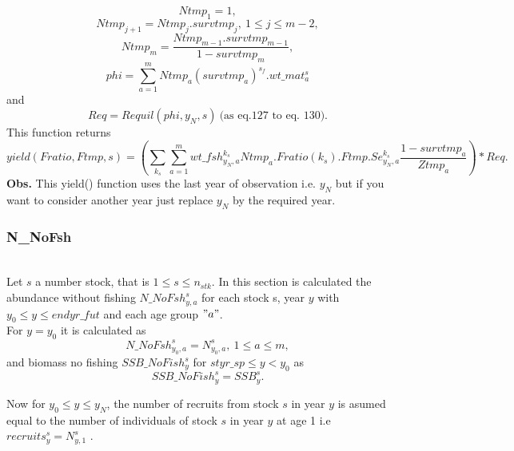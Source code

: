\documentclass{article}
\begin{document}
\begin{equation}
    Ntmp_1=1,
\end{equation}
\begin{equation}
    Ntmp_{j+1}=Ntmp_j.survtmp_j, \ 1\leq j \leq m-2,
\end{equation}
\begin{equation}
    Ntmp_m=\dfrac{Ntmp_{m-1}.survtmp_{m-1}}{1-survtmp_m},
\end{equation}
\begin{equation}
    phi=\sum_{a=1}^m Ntmp_a(survtmp_a)^{s_f}.wt\_mat^s_a
\end{equation}
and
\begin{equation}
    Req=Requil(phi,y_N,s) \  \text{(as eq.127 to eq. 130)}.
\end{equation}
This function returns
\begin{equation}
    yield(Fratio, Ftmp,s)=\left(\sum_{k_s}\sum_{a=1}^m wt\_fsh^{k_s}_{y_N,a}Ntmp_a.Fratio(k_s).Ftmp.Se^{k_s}_{y_N,a}\dfrac{1-survtmp_a}{Ztmp_a}\right)*Req.
\end{equation}
\textbf{Obs.} This yield() function uses the last year of observation i.e. $y_N$ but if you want to consider another year just replace $y_N$ by the required year.\\

\subsubsection{N\_NoFsh}\\
Let $s$ a number stock,  that is $1\leq s \leq n_{stk}$. In this section is calculated the abundance without fishing $N\_NoFsh^s_{y,a}$ for each stock s, year $y$ with $y_0\leq y \leq endyr\_fut$ and each age group $"a"$. \\

For $y=y_0$ it is calculated as 
\begin{equation}
N\_NoFsh^s_{y_0,a}=N^s_{y_0,a}, \ 1\leq a \leq m,
\end{equation}
and biomass no fishing  $SSB\_NoFish^s_y$ for $styr\_sp \leq y < y_0$ as
\begin{equation}
    SSB\_NoFish^s_y=SSB^s_{y}.
\end{equation}


Now for $y_0\leq y \leq y_N$, the number of recruits from stock $s$ in year $y$ is asumed equal to the number of individuals of stock $s$ in year $y$ at age 1 i.e $recruits^s_y=N^s_{y,1}$ .\\ 
\end{document}
